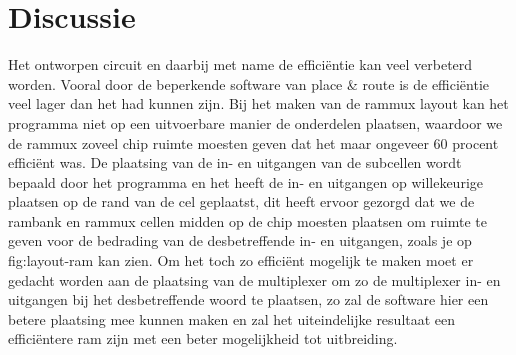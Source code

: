 \documentclass{scrartcl}  %
\begin{document}
\section{Discussie}
Het ontworpen circuit en daarbij met name de efficiëntie kan veel verbeterd worden. 
Vooral door de beperkende software van place & route is de efficiëntie veel lager dan het had kunnen zijn. 
Bij het maken van de rammux layout kan het programma niet op een uitvoerbare manier de onderdelen plaatsen, waardoor we de rammux zoveel chip ruimte moesten geven dat het maar ongeveer 60 procent efficiënt was.
De plaatsing van de in- en uitgangen van de subcellen wordt bepaald door het programma en het heeft de in- en uitgangen op willekeurige plaatsen op de rand van de cel geplaatst, dit heeft ervoor gezorgd dat we de rambank en rammux cellen midden op de chip moesten plaatsen om ruimte te geven voor de bedrading van de desbetreffende in- en uitgangen, zoals je op fig:layout-ram kan zien.
Om het toch zo efficiënt mogelijk te maken moet er gedacht worden aan de plaatsing van de multiplexer om zo de multiplexer in- en uitgangen bij het desbetreffende woord te plaatsen, zo zal de software hier een betere plaatsing mee kunnen maken en zal het uiteindelijke resultaat een efficiëntere ram zijn met een beter mogelijkheid tot uitbreiding. 
\end{document}
